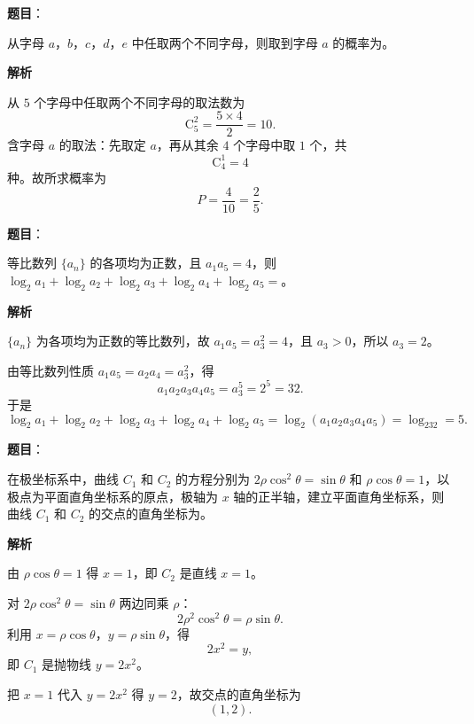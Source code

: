 \begin{answer}

\textbf{题目}：

从字母 $a$，$b$，$c$，$d$，$e$ 中任取两个不同字母，则取到字母 $a$ 的概率为\gkblank{}。

\textbf{解析}

从 $5$ 个字母中任取两个不同字母的取法数为
\nopagebreak[4]
\[\mathrm C_5^2=\frac{5\times4}{2}=10 .\]
含字母 $a$ 的取法：先取定 $a$，再从其余 $4$ 个字母中取 $1$ 个，共
\nopagebreak[4]
\[\mathrm C_4^1=4\]
种。故所求概率为
\nopagebreak[4]
\[P=\frac4{10}=\frac25 .\]


\end{answer}
\begin{answer}

\textbf{题目}：

等比数列 $\{a_n\}$ 的各项均为正数，且 $a_1a_5=4$，则 $\log_2a_1+\log_2a_2+\log_2a_3+\log_2a_4+\log_2a_5=$\gkblank{}。

\textbf{解析}

$\{a_n\}$ 为各项均为正数的等比数列，故 $a_1a_5=a_3^2=4$，且 $a_3>0$，所以 $a_3=2$。

由等比数列性质 $a_1a_5=a_2a_4=a_3^2$，得
\nopagebreak[4]
\[a_1a_2a_3a_4a_5=a_3^5=2^5=32 .\]
于是
\nopagebreak[4]
\[\log_2a_1+\log_2a_2+\log_2a_3+\log_2a_4+\log_2a_5
=\log_2(a_1a_2a_3a_4a_5)=\log_232=5 .\]


\end{answer}
\begin{answer}

\textbf{题目}：

在极坐标系中，曲线 $C_1$ 和 $C_2$ 的方程分别为 $2\rho\cos^2\theta=\sin\theta$ 和 $\rho\cos\theta=1$，以极点为平面直角坐标系的原点，极轴为 $x$ 轴的正半轴，建立平面直角坐标系，则曲线 $C_1$ 和 $C_2$ 的交点的直角坐标为\gkblank{}。

\textbf{解析}

由 $\rho\cos\theta=1$ 得 $x=1$，即 $C_2$ 是直线 $x=1$。

对 $2\rho\cos^2\theta=\sin\theta$ 两边同乘 $\rho$：
\nopagebreak[4]
\[2\rho^2\cos^2\theta=\rho\sin\theta .\]
利用 $x=\rho\cos\theta$，$y=\rho\sin\theta$，得
\nopagebreak[4]
\[2x^2=y,\]
即 $C_1$ 是抛物线 $y=2x^2$。

把 $x=1$ 代入 $y=2x^2$ 得 $y=2$，故交点的直角坐标为
\nopagebreak[4]
\[(1,2).\]


\end{answer}

